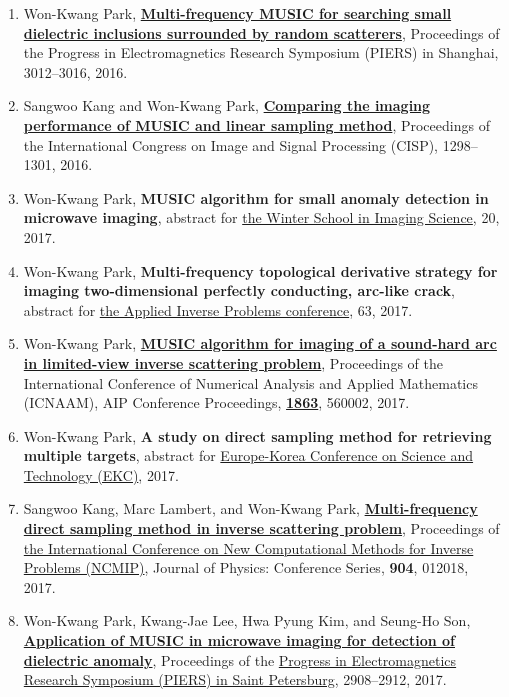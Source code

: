 \documentclass[10pt,A4]{article}
\begin{document}
\begin{enumerate}
\item\label{C-PIERS2016C} Won-Kwang Park, \href{http://dx.doi.org/10.1109/PIERS.2016.7735179}{\textbf{Multi-frequency MUSIC for searching small dielectric inclusions surrounded by random scatterers}}, Proceedings of the Progress in Electromagnetics Research Symposium (PIERS) in Shanghai, 3012--3016, 2016.
\item\label{C-CISP2016} Sangwoo Kang and Won-Kwang Park, \href{https://doi.org/10.1109/CISP-BMEI.2016.7852916}{\textbf{Comparing the imaging performance of MUSIC and linear sampling method}}, Proceedings of the  International Congress on Image and Signal Processing (CISP), 1298--1301, 2016.
\item\label{C-WSI2017} Won-Kwang Park, \textbf{MUSIC algorithm for small anomaly detection in microwave imaging}, abstract for \href{https://winterschool2017.mediviewsoft.com/}{the  Winter School in Imaging Science}, 20, 2017.
\item\label{C-AIPC2017} Won-Kwang Park, \textbf{Multi-frequency topological derivative strategy for imaging two-dimensional perfectly conducting, arc-like crack}, abstract for \href{http://aip2017.csp.escience.cn/dct/page/1}{the  Applied Inverse Problems conference}, 63, 2017.
\item\label{C-ICNAAM2017} Won-Kwang Park, \textbf{\href{http://dx.doi.org/10.1063/1.4992685}{MUSIC algorithm for imaging of a sound-hard arc in limited-view inverse scattering problem}}, Proceedings of the  International Conference of Numerical Analysis and Applied Mathematics (ICNAAM), AIP Conference Proceedings, \href{https://aip.scitation.org/toc/apc/1863/1?expanded=1863}{\textbf{1863}}, 560002, 2017.
\item\label{C-EKC2017} Won-Kwang Park, \textbf{A study on direct sampling method for retrieving multiple targets}, abstract for \href{http://www.ekc2017.org/resource/data/EKC2017-Proceedings.zip}{Europe-Korea Conference on Science and Technology (EKC)}, 2017.
\item\label{C-NCMIP2017} Sangwoo Kang, Marc Lambert, and Won-Kwang Park, \href{http://dx.doi.org/10.1088/1742-6596/904/1/012018}{\textbf{Multi-frequency direct sampling method in inverse scattering problem}}, Proceedings of \href{http://complement.farman.ens-cachan.fr/NCMIP_2017.html}{the  International Conference on New Computational Methods for Inverse Problems (NCMIP)}, Journal of Physics: Conference Series, \textbf{904}, 012018, 2017.
\item\label{C-PIERS2017B} Won-Kwang Park, Kwang-Jae Lee, Hwa Pyung Kim, and Seung-Ho Son, \href{https://doi.org/10.1109/PIERS.2017.8262251}{\textbf{Application of MUSIC in microwave imaging for detection of dielectric anomaly}}, Proceedings of the \href{http://www.piers.org/piers2017StPetersburg/}{Progress in Electromagnetics Research Symposium (PIERS) in Saint Petersburg}, 2908--2912, 2017.

\end{enumerate}
\end{document}
